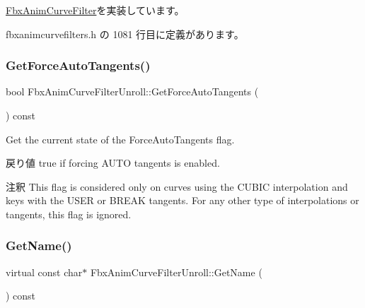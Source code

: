 \hyperlink{class_fbx_anim_curve_filter_a6a69996c47c0e6f63a0f8b0d5fa806a0}{Fbx\+Anim\+Curve\+Filter}を実装しています。



 fbxanimcurvefilters.\+h の 1081 行目に定義があります。

\mbox{\label{class_fbx_anim_curve_filter_unroll_a0d60638cd87eb0848e7995a42832fca4}} 
\subsubsection{\texorpdfstring{Get\+Force\+Auto\+Tangents()}{GetForceAutoTangents()}}
{\footnotesize\ttfamily bool Fbx\+Anim\+Curve\+Filter\+Unroll\+::\+Get\+Force\+Auto\+Tangents (\begin{DoxyParamCaption}{ }\end{DoxyParamCaption}) const}

Get the current state of the Force\+Auto\+Tangents flag. \begin{DoxyReturn}{戻り値}
{\ttfamily true} if forcing A\+U\+TO tangents is enabled. 
\end{DoxyReturn}
\begin{DoxyRemark}{注釈}
This flag is considered only on curves using the C\+U\+B\+IC interpolation and keys with the U\+S\+ER or B\+R\+E\+AK tangents. For any other type of interpolations or tangents, this flag is ignored. 
\end{DoxyRemark}
\mbox{\label{class_fbx_anim_curve_filter_unroll_a01282004cc60febeff844d9c44f94e5c}} 
\subsubsection{\texorpdfstring{Get\+Name()}{GetName()}}
{\footnotesize\ttfamily virtual const char$\ast$ Fbx\+Anim\+Curve\+Filter\+Unroll\+::\+Get\+Name (\begin{DoxyParamCaption}{ }\end{DoxyParamCaption}) const\hspace{0.3cm}{\ttfamily [virtual]}}

